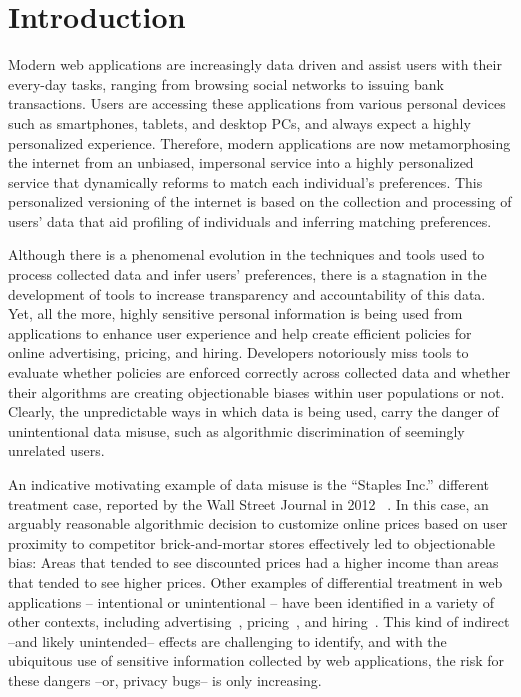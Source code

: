 
\section{Introduction}

Modern web applications are increasingly data driven and assist users
with their every-day tasks, ranging from browsing social networks to
issuing bank transactions. Users are accessing these applications from
various personal devices such as smartphones, tablets, and desktop PCs,
and always expect a highly personalized experience. Therefore, modern
applications are now metamorphosing the internet from an unbiased, impersonal
service into a highly personalized service that dynamically reforms to match
each individual's preferences. This personalized versioning of the internet
is based on the collection and processing of users' data that aid profiling
of individuals and inferring matching preferences.

Although there is a phenomenal evolution in the techniques and tools used to
process collected data and infer users' preferences, there is a stagnation
in the development of tools to increase transparency and accountability of
this data. Yet, all the more,  highly sensitive personal information is being
used from applications to enhance user experience and help create efficient
policies for online advertising, pricing, and hiring.
Developers notoriously miss tools to evaluate whether policies are
enforced correctly across collected data and whether their algorithms are
creating objectionable biases within user populations or not. Clearly,
the unpredictable ways in which data is being used, carry the danger of
unintentional data misuse, such as algorithmic discrimination of seemingly
unrelated users.

An indicative motivating example of data misuse is the ``Staples Inc.''
different treatment case, reported by the Wall Street Journal in 2012
~\cite{Staples}. In this case, an arguably reasonable algorithmic decision
to customize online prices based on user proximity to competitor
brick-and-mortar stores effectively led to objectionable bias:
Areas that tended to see discounted prices had a higher income than areas
that tended to see higher prices. Other examples of differential treatment in
web applications – intentional or unintentional – have been identified in a
variety of other contexts, including advertising~\cite{Sweeney:AdDiscrimination},
pricing~\cite{Hannak:PriceDiscrimination}, and
hiring~\cite{acquisiti:HiringDiscrimination}. This kind of indirect --and likely
unintended-- effects are challenging to identify, and with the ubiquitous use
of sensitive information collected by web applications, the risk for these
dangers --or, privacy bugs-- is only increasing.

